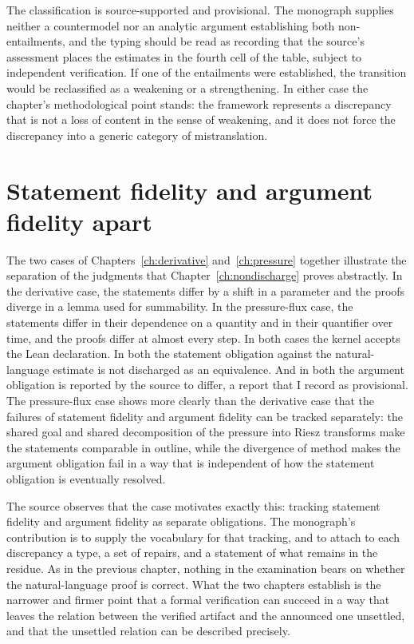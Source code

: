 The classification is source-supported and provisional. The monograph supplies neither a countermodel nor an analytic argument establishing both non-entailments, and the typing should be read as recording that the source's assessment places the estimates in the fourth cell of the table, subject to independent verification. If one of the entailments were established, the transition would be reclassified as a weakening or a strengthening. In either case the chapter's methodological point stands: the framework represents a discrepancy that is not a loss of content in the sense of weakening, and it does not force the discrepancy into a generic category of mistranslation.

\section{Statement fidelity and argument fidelity apart}

The two cases of Chapters~\ref{ch:derivative} and~\ref{ch:pressure} together illustrate the separation of the judgments that Chapter~\ref{ch:nondischarge} proves abstractly. In the derivative case, the statements differ by a shift in a parameter and the proofs diverge in a lemma used for summability. In the pressure-flux case, the statements differ in their dependence on a quantity and in their quantifier over time, and the proofs differ at almost every step. In both cases the kernel accepts the Lean declaration. In both the statement obligation against the natural-language estimate is not discharged as an equivalence. And in both the argument obligation is reported by the source to differ, a report that I record as provisional. The pressure-flux case shows more clearly than the derivative case that the failures of statement fidelity and argument fidelity can be tracked separately: the shared goal and shared decomposition of the pressure into Riesz transforms make the statements comparable in outline, while the divergence of method makes the argument obligation fail in a way that is independent of how the statement obligation is eventually resolved.

The source observes that the case motivates exactly this: tracking statement fidelity and argument fidelity as separate obligations. The monograph's contribution is to supply the vocabulary for that tracking, and to attach to each discrepancy a type, a set of repairs, and a statement of what remains in the residue. As in the previous chapter, nothing in the examination bears on whether the natural-language proof is correct. What the two chapters establish is the narrower and firmer point that a formal verification can succeed in a way that leaves the relation between the verified artifact and the announced one unsettled, and that the unsettled relation can be described precisely.
